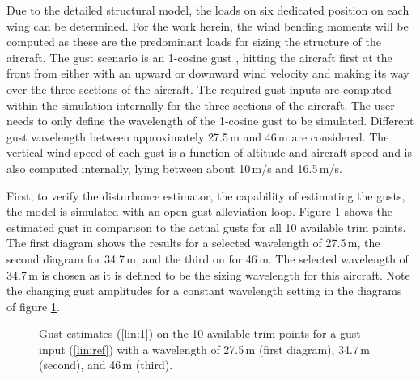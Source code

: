\documentclass[graybox]{svmult}
\begin{document}
Due to the detailed structural model, the loads on six dedicated position on each wing can be determined. For the work herein, the wind bending moments will be computed as these are the predominant loads for sizing the structure of the aircraft.
The gust scenario is an 1-cosine gust \cite{Flomenhoft94,Fuller95}, hitting the aircraft first at the front from either with an upward or downward wind velocity and making its way over the three sections of the aircraft.
The required gust inputs are computed within the simulation internally for the three sections of the aircraft. The user needs to only define the  wavelength of the 1-cosine gust to be simulated.  Different gust wavelength between approximately 27.5\,m and 46\,m are considered. The vertical wind speed of each gust is a function of altitude and aircraft speed and is also computed internally, lying between about 10\,m/s and 16.5\,m/s.

First, to verify the disturbance estimator, the capability of estimating the gusts, the model is simulated with an open gust alleviation loop. Figure \ref{fig:est} shows the estimated gust in comparison to the actual gusts for all 10 available trim points. The first diagram shows the results for a selected wavelength of  27.5\,m, the second diagram for 34.7\,m, and the third on for 46\,m. The selected wavelength of 34.7\,m is chosen as it is defined to be the sizing wavelength for this aircraft. Note the changing gust amplitudes for a constant wavelength setting in the diagrams of figure \ref{fig:est}.

\begin{figure}[hbt]
	\sidecaption[]
	
	\caption{Gust estimates (\ref{lin:1}) on the 10 available trim points for a gust input (\ref{lin:ref}) with a wavelength of 27.5\,m (first diagram), 34.7\,m (second), and 46\,m (third). }
	\label{fig:est}
\end{figure}
\end{document}
